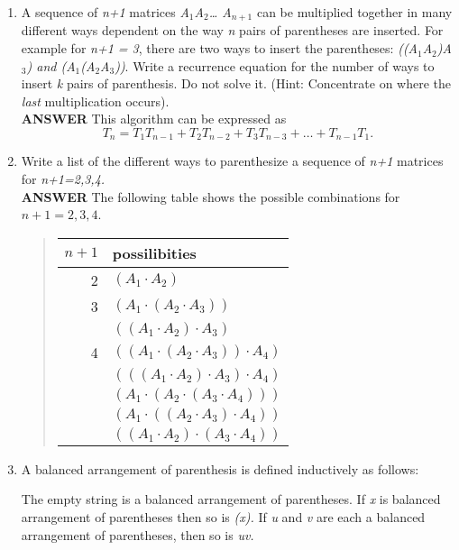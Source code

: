 \documentclass{article}
\begin{document}
\begin{enumerate}
\begin{enumerate}
\item
A sequence of \textit{n+1} matrices
\textit{A}$_{\mathit{1}}$\textit{A}$_{\mathit{2}}$\textit{\dots
A}$_{\mathit{n+1}}$ can be multiplied together in many different
ways dependent on the way \textit{n} pairs of parentheses are
inserted. For example for \textit{n+1 = 3}, there are two ways to
insert the parentheses:
\textit{((A}$_{\mathit{1}}$\textit{A}$_{\mathit{2}}$\textit{)A}$_{\mathit{3}}$\textit{)
and
(A}$_{\mathit{1}}$\textit{(A}$_{\mathit{2}}$\textit{A}$_{\mathit{3}}$\textit{))}.
Write a recurrence equation for the number of ways to insert
\textit{k} pairs of parenthesis. Do not solve it. (Hint:
Concentrate on where the \textit{last} multiplication
occurs). \\
\vskip 10pt  \textbf{ANSWER} This algorithm can be expressed as
$$
T_n = T_1T_{n-1} + T_2T_{n-2} + T_3T_{n-3} + \ldots + T_{n-1}T_1.
$$
\item
Write a list of the different ways to parenthesize a sequence
of \textit{n+1} matrices for \textit{n+1=2,3,4.}\\
\vskip 10pt  \textbf{ANSWER} The following table shows the
possible combinations for $n+1 = 2,3,4$.
\begin{quote}
\begin{tabular}{r|l}
$n+1$ & possilibities\\
\hline
2   &   $(A_1 \cdot A_2)$ \\
\hline
3   &   $(A_1 \cdot (A_2 \cdot A_3))$   \\
    &   $((A_1 \cdot A_2) \cdot A_3)$   \\
\hline
4   &   $((A_1 \cdot (A_2 \cdot A_3)) \cdot A_4)$ \\
    &   $(((A_1 \cdot A_2) \cdot A_3) \cdot A_4)$ \\
    &   $(A_1 \cdot (A_2 \cdot (A_3 \cdot A_4)))$ \\
    &   $(A_1 \cdot ((A_2 \cdot A_3) \cdot A_4))$ \\
    &   $((A_1 \cdot A_2) \cdot (A_3 \cdot A_4))$ \\
\end{tabular}
\end{quote}
\item
A balanced arrangement of parenthesis is defined inductively as
follows:


The empty string is a balanced arrangement of parentheses. If \textit{x}
is balanced arrangement of parentheses then so is \textit{(x).} If \textit{u} and \textit{v} are
each a balanced arrangement of parentheses, then so is \textit{uv.}




\end{enumerate}
\end{enumerate}
\end{document}
